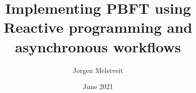 \documentclass[12pt, a4paper]{report}
\numberwithin{figure}{section}
\numberwithin{table}{section}
\begin{document}
	\hspace*{-7mm}
	\vspace*{-15mm}
	\thispagestyle{empty}
	\newpage

	
	
	\title{Implementing PBFT using Reactive programming and asynchronous workflows}
	\author{Jørgen Melstveit}
	\date{June 2021}
	\maketitle
	\tableofcontents
	\newpage
\end{document}
